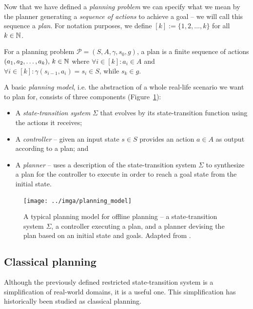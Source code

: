 Now that we have defined a \textit{planning problem} we can specify what we mean
by the planner generating a \textit{sequence of actions} to achieve a goal -- we will
call this sequence a \textit{plan}.
For notation purposes, we define $[k] := \{1, 2, \ldots, k\}$ for all $k \in \mathbb{N}$.

\begin{defn}[Plan]\label{defn:plan}\citep[Section~1.5]{Ghallab2004}
For a planning problem $\mathcal{P} = (S, A, \gamma, s_0, g)$,
a plan is a finite sequence of actions $(a_1, a_2, \ldots, a_k),\, k \in \mathbb{N}$ where
$\forall i \in [k] : a_i \in A$ and
$\forall i \in [k] : \gamma(s_{i-1}, a_i) = s_i \in S$, while $s_k \in g$.
\end{defn}

A basic \textit{planning model}, i.e. the abstraction of a whole real-life scenario
we want to plan for, consists of three components (Figure~\ref{fig:planning-model}):

\begin{itemize}
\item A \textit{state-transition system} $\Sigma$ that evolves by its state-transition function using the actions
it receives;
\item A \textit{controller} -- given an input state $s \in S$ provides an action $a \in A$ as output according
to a plan; and
\item A \textit{planner} -- uses a description of the state-transition system $\Sigma$ to synthesize a plan for the controller
to execute in order to reach a goal state from the initial state.
\end{itemize}

\begin{figure}[tb]
\begin{center}
\texttt{[image: ../imga/planning\_model]}
\end{center}
\caption[A typical planning model for offline planning.]{A typical planning model for offline planning -- a state-transition system $\Sigma$, a controller executing a plan, and a planner devising the plan based on an initial state and goals. Adapted from \citep[Figure~1.3]{Ghallab2004}.}
\label{fig:planning-model}
\end{figure}

\subsection{Classical planning}\label{classical-planning}

Although the previously defined restricted state-transition system is a simplification of real-world
domains, it is a useful one. 
This simplification has historically been studied as classical planning.

